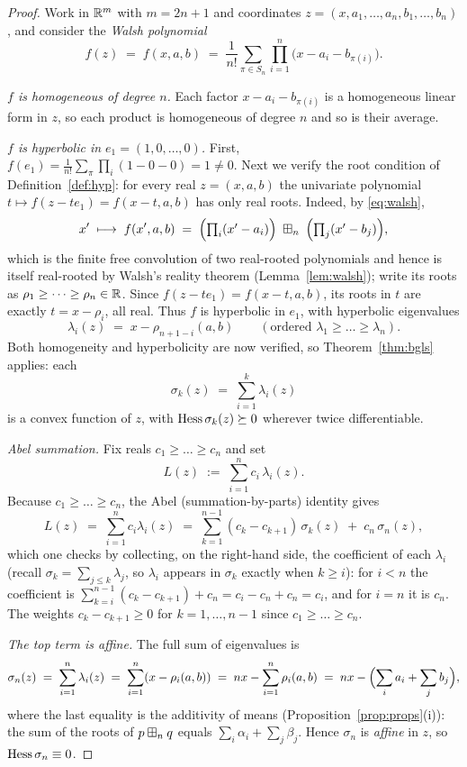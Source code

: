 \begin{proof}
Work in $\mathbb{R}^m$ with $m=2n+1$ and coordinates $z=(x,a_1,\dots,a_n,b_1,\dots,b_n)$,
and consider the \emph{Walsh polynomial}
\[
f(z)\;=\;f(x,a,b)\;=\;\frac{1}{n!}\sum_{\pi\in S_n}\prod_{i=1}^n\bigl(x-a_i-b_{\pi(i)}\bigr).
\]

\smallskip\noindent\textit{$f$ is homogeneous of degree $n$.} Each factor
$x-a_i-b_{\pi(i)}$ is a homogeneous linear form in $z$, so each product is
homogeneous of degree $n$ and so is their average.

\smallskip\noindent\textit{$f$ is hyperbolic in $e_1=(1,0,\dots,0)$.} First,
$f(e_1)=\frac1{n!}\sum_\pi\prod_i(1-0-0)=1\ne0$. Next we verify the root
condition of Definition~\ref{def:hyp}: for every real $z=(x,a,b)$ the univariate
polynomial $t\mapsto f(z-te_1)=f(x-t,a,b)$ has only real roots. Indeed, by
\eqref{eq:walsh},
\[
x'\;\longmapsto\;f(x',a,b)\;=\;\Bigl(\textstyle\prod_i(x'-a_i)\Bigr)\;\boxplus_n\;
\Bigl(\textstyle\prod_j(x'-b_j)\Bigr),
\]
which is the finite free convolution of two real-rooted polynomials and hence is
itself real-rooted by Walsh's reality theorem (Lemma~\ref{lem:walsh}); write its
roots as $\rho_1\ge\dots\ge\rho_n\in\mathbb{R}$. Since $f(z-te_1)=f(x-t,a,b)$, its
roots in $t$ are exactly $t=x-\rho_i$, all real. Thus $f$ is hyperbolic in
$e_1$, with hyperbolic eigenvalues
\[
\lambda_i(z)\;=\;x-\rho_{n+1-i}(a,b)\qquad(\text{ordered }\lambda_1\ge\dots\ge\lambda_n).
\]
Both homogeneity and hyperbolicity are now verified, so
Theorem~\ref{thm:bgls} applies: each
\[
\sigma_k(z)\;=\;\sum_{i=1}^k\lambda_i(z)
\]
is a convex function of $z$, with $\operatorname{Hess}\sigma_k(z)\succeq 0$ wherever twice
differentiable.

\smallskip\noindent\textit{Abel summation.} Fix reals $c_1\ge\dots\ge c_n$ and
set
\[
L(z)\;:=\;\sum_{i=1}^n c_i\,\lambda_i(z).
\]
Because $c_1\ge\dots\ge c_n$, the Abel (summation-by-parts) identity gives
\[
L(z)\;=\;\sum_{i=1}^n c_i\lambda_i(z)
\;=\;\sum_{k=1}^{n-1}(c_k-c_{k+1})\,\sigma_k(z)\;+\;c_n\,\sigma_n(z),
\]
which one checks by collecting, on the right-hand side, the coefficient of each
$\lambda_i$ (recall $\sigma_k=\sum_{j\le k}\lambda_j$, so $\lambda_i$ appears in
$\sigma_k$ exactly when $k\ge i$): for $i<n$ the coefficient is
$\sum_{k=i}^{n-1}(c_k-c_{k+1})+c_n=c_i-c_n+c_n=c_i$, and for $i=n$ it is $c_n$.
The weights $c_k-c_{k+1}\ge0$ for $k=1,\dots,n-1$ since $c_1\ge\dots\ge c_n$.

\smallskip\noindent\textit{The top term is affine.} The full sum of eigenvalues
is
\[
\sigma_n(z)\;=\;\sum_{i=1}^n\lambda_i(z)\;=\;\sum_{i=1}^n(x-\rho_i(a,b))
\;=\;nx-\sum_{i=1}^n\rho_i(a,b)
\;=\;nx-\Bigl(\sum_i a_i+\sum_j b_j\Bigr),
\]
where the last equality is the additivity of means
(Proposition~\ref{prop:props}(i)): the sum of the roots of $p\boxplus_n q$ equals
$\sum_i\alpha_i+\sum_j\beta_j$. Hence $\sigma_n$ is \emph{affine} in $z$, so
$\operatorname{Hess}\sigma_n\equiv0$.


\end{proof}
